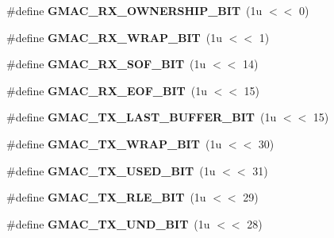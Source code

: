 \begin{DoxyCompactItemize}
\mbox{\label{group__gmac__defines_gac5c514102a690945b90f7e15523f8ec2}} 
\#define {\bfseries G\+M\+A\+C\+\_\+\+R\+X\+\_\+\+O\+W\+N\+E\+R\+S\+H\+I\+P\+\_\+\+B\+IT}~(1u $<$$<$  0)
\item 
\mbox{\label{group__gmac__defines_gabf72fbf8c37c05c4c7b0fe960e6e60d0}} 
\#define {\bfseries G\+M\+A\+C\+\_\+\+R\+X\+\_\+\+W\+R\+A\+P\+\_\+\+B\+IT}~(1u $<$$<$  1)
\item 
\mbox{\label{group__gmac__defines_gaf14928ff9adc332b308717f95a059466}} 
\#define {\bfseries G\+M\+A\+C\+\_\+\+R\+X\+\_\+\+S\+O\+F\+\_\+\+B\+IT}~(1u $<$$<$ 14)
\item 
\mbox{\label{group__gmac__defines_gaa589fef4966d492f2651d0eb6de7202a}} 
\#define {\bfseries G\+M\+A\+C\+\_\+\+R\+X\+\_\+\+E\+O\+F\+\_\+\+B\+IT}~(1u $<$$<$ 15)
\item 
\mbox{\label{group__gmac__defines_ga0cc07948b7d58f584f09486dddb212e7}} 
\#define {\bfseries G\+M\+A\+C\+\_\+\+T\+X\+\_\+\+L\+A\+S\+T\+\_\+\+B\+U\+F\+F\+E\+R\+\_\+\+B\+IT}~(1u $<$$<$ 15)
\item 
\mbox{\label{group__gmac__defines_ga2d889163272f81b5c43a403ec4f0ad13}} 
\#define {\bfseries G\+M\+A\+C\+\_\+\+T\+X\+\_\+\+W\+R\+A\+P\+\_\+\+B\+IT}~(1u $<$$<$ 30)
\item 
\mbox{\label{group__gmac__defines_ga908ccdfa8893fd50defbbdd9ff79b2cd}} 
\#define {\bfseries G\+M\+A\+C\+\_\+\+T\+X\+\_\+\+U\+S\+E\+D\+\_\+\+B\+IT}~(1u $<$$<$ 31)
\item 
\mbox{\label{group__gmac__defines_gac8690d52025828c4548d7ff0b7adce17}} 
\#define {\bfseries G\+M\+A\+C\+\_\+\+T\+X\+\_\+\+R\+L\+E\+\_\+\+B\+IT}~(1u $<$$<$ 29)
\item 
\mbox{\label{group__gmac__defines_gaf0f53107444b3b3c6b1c53e26a03445c}} 
\#define {\bfseries G\+M\+A\+C\+\_\+\+T\+X\+\_\+\+U\+N\+D\+\_\+\+B\+IT}~(1u $<$$<$ 28)
\item 
\mbox{\label{group__gmac__defines_ga147dffabd1b39cbdb7be29c684b773ed}} 
$$
\end{DoxyCompactItemize}
